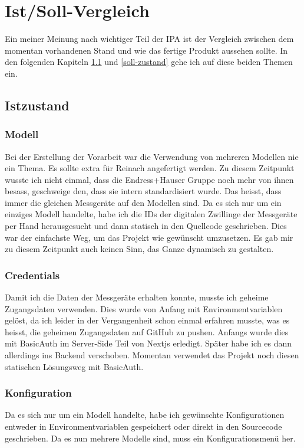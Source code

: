 \section{Ist/Soll-Vergleich}
Ein meiner Meinung nach wichtiger Teil der IPA ist der Vergleich zwischen dem momentan vorhandenen Stand und wie das fertige Produkt aussehen sollte. In den folgenden Kapiteln \ref{ist-zustand} und \ref{soll-zustand} gehe ich auf diese beiden Themen ein.
\subsection{Istzustand} \label{ist-zustand}
\subsubsection{Modell}
Bei der Erstellung der Vorarbeit war die Verwendung von mehreren Modellen nie ein Thema. Es sollte extra für Reinach angefertigt werden. Zu diesem Zeitpunkt wusste ich nicht einmal, dass die Endress+Hauser Gruppe noch mehr von ihnen besass, geschweige den, dass sie intern standardisiert wurde. Das heisst, dass immer die gleichen Messgeräte auf den Modellen sind.
\newline
Da es sich nur um ein einziges Modell handelte, habe ich die IDs der digitalen Zwillinge der Messgeräte per Hand herausgesucht und dann statisch in den Quellcode geschrieben. Dies war der einfachste Weg, um das Projekt wie gewünscht umzusetzen. Es gab mir zu diesem Zeitpunkt auch keinen Sinn, das Ganze dynamisch zu gestalten.
\subsubsection{Credentials}
Damit ich die Daten der Messgeräte erhalten konnte, musste ich geheime Zugangsdaten verwenden. Dies wurde von Anfang mit Environmentvariablen gelöst, da ich leider in der Vergangenheit schon einmal erfahren musste, was es heisst, die geheimen Zugangsdaten auf GitHub zu pushen. Anfangs wurde dies mit BasicAuth im Server-Side Teil von Nextjs erledigt. Später habe ich es dann allerdings ins Backend verschoben. Momentan verwendet das Projekt noch diesen statischen Lösungsweg mit BasicAuth.
\subsubsection{Konfiguration}
Da es sich nur um ein Modell handelte, habe ich gewünschte Konfigurationen entweder in Environmentvariablen gespeichert oder direkt in den Sourcecode geschrieben. Da es nun mehrere Modelle sind, muss ein Konfigurationsmenü her.
